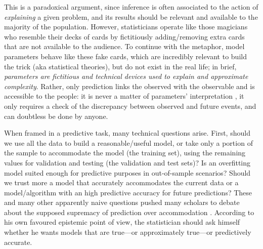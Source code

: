 \documentclass{statsoc}
\begin{document}
This is a paradoxical argument, since inference is often associated to the action of \emph{explaining} a given problem, and its results should 
be relevant and available to the majority of the population. However, statisticians operate like those magicians who resemble their decks of cards 
by fictitiously adding/removing  extra cards that are not available to the audience. To continue with the metaphor,  model parameters behave like 
these fake cards, which are incredibly relevant to build the trick (aka statistical theories), but do not exist in the real life; in brief, 
\emph{parameters are  fictitious and technical devices used to explain and approximate  complexity}. Rather, only prediction links the observed with the observable and is accessible to the people: it is never a matter of 
parameters' interpretation \citep{billheimer2019predictive}, it only requires a check of the discrepancy between observed and future events, and can doubtless be done by anyone.  

When framed in a predictive task, many technical questions arise. First, should we use all the data to build a reasonable/useful model, or take only a portion of the 
sample to accommodate the model (the training set), using the remaining values for validation and testing (the validation and test sets)? Is 
an overfitting model suited enough for predictive purposes in out-of-sample scenarios? Should we trust more a model that accurately accommodates the 
current data or a model/algorithm with an high predictive accuracy for future predictions? These and many other apparently naive questions pushed many scholars to debate 
about the supposed supremacy of prediction over accommodation \citep{maher1988prediction, hitchcock2004prediction, worrall2014prediction}.  According to his own favoured epistemic point of view, the 
statistician should ask himself whether he wants models that are true---or  approximately true---or predictively accurate. 
\end{document}
